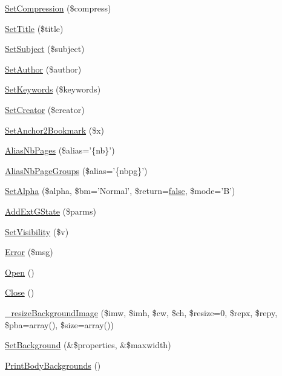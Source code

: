 \begin{DoxyCompactItemize}
\item 
\hyperlink{classm_p_d_f_ae3c24d3aba426066db7500462b86772a}{Set\-Compression} (\$compress)
\item 
\hyperlink{classm_p_d_f_a4148f61d1c791c0685f0a0fe2630797d}{Set\-Title} (\$title)
\item 
\hyperlink{classm_p_d_f_ae2c848e855eb8cda23893b986f96afc4}{Set\-Subject} (\$subject)
\item 
\hyperlink{classm_p_d_f_a12ac3844c57f702b7d61943e3262b670}{Set\-Author} (\$author)
\item 
\hyperlink{classm_p_d_f_af1d96d57765b60bd4aabdbb26d49c16a}{Set\-Keywords} (\$keywords)
\item 
\hyperlink{classm_p_d_f_ae18976a4240664ff512ec9f41444f398}{Set\-Creator} (\$creator)
\item 
\hyperlink{classm_p_d_f_a2a2382822d5b04204a5e466927637f53}{Set\-Anchor2\-Bookmark} (\$x)
\item 
\hyperlink{classm_p_d_f_a36cbd31c67e4373a31215c055cdd8a33}{Alias\-Nb\-Pages} (\$alias='\{nb\}')
\item 
\hyperlink{classm_p_d_f_a27fa1402a94089e8bd2a0a1064006d98}{Alias\-Nb\-Page\-Groups} (\$alias='\{nbpg\}')
\item 
\hyperlink{classm_p_d_f_aa7a4cefc02faf0ed22e4f76c1bfa609e}{Set\-Alpha} (\$alpha, \$bm='Normal', \$return=\hyperlink{ttfontsuni_8php_afbaa04e5cc97693dc668b3c45d3dd740}{false}, \$mode='B')
\item 
\hyperlink{classm_p_d_f_a63d4c504ab22b79f47c93c219122c3cf}{Add\-Ext\-G\-State} (\$parms)
\item 
\hyperlink{classm_p_d_f_afbc1407b9953e5827ed2dc7612449613}{Set\-Visibility} (\$v)
\item 
\hyperlink{classm_p_d_f_a2174cadd5b9951e2d731493f3d407264}{Error} (\$msg)
\item 
\hyperlink{classm_p_d_f_a930289abeae9381e1c6f41895beb5d7a}{Open} ()
\item 
\hyperlink{classm_p_d_f_a1a9af15fc52dfa7f07e25bfd2eba36bb}{Close} ()
\item 
\hyperlink{classm_p_d_f_a3d2caef10eb5d3d34a5ee42a70c90ed2}{\-\_\-resize\-Background\-Image} (\$imw, \$imh, \$cw, \$ch, \$resize=0, \$repx, \$repy, \$pba=array(), \$size=array())
\item 
\hyperlink{classm_p_d_f_a200af881037c88d28d53a6153bee109a}{Set\-Background} (\&\$properties, \&\$maxwidth)
\item 
\hyperlink{classm_p_d_f_a3cb214cf6aeaeab07e19d25165c39812}{Print\-Body\-Backgrounds} ()
\item 

\end{DoxyCompactItemize}
